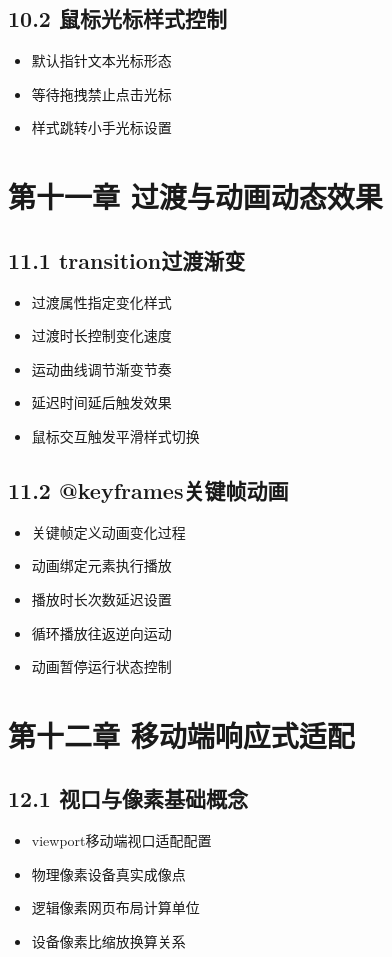 \subsection{10.2 鼠标光标样式控制}
\begin{itemize}[leftmargin=*]
\item 默认指针文本光标形态
\item 等待拖拽禁止点击光标
\item 样式跳转小手光标设置
\end{itemize}

\section{第十一章 过渡与动画动态效果}
\subsection{11.1 transition过渡渐变}
\begin{itemize}[leftmargin=*]
\item 过渡属性指定变化样式
\item 过渡时长控制变化速度
\item 运动曲线调节渐变节奏
\item 延迟时间延后触发效果
\item 鼠标交互触发平滑样式切换
\end{itemize}

\subsection{11.2 @keyframes关键帧动画}
\begin{itemize}[leftmargin=*]
\item 关键帧定义动画变化过程
\item 动画绑定元素执行播放
\item 播放时长次数延迟设置
\item 循环播放往返逆向运动
\item 动画暂停运行状态控制
\end{itemize}

\section{第十二章 移动端响应式适配}
\subsection{12.1 视口与像素基础概念}
\begin{itemize}[leftmargin=*]
\item viewport移动端视口适配配置
\item 物理像素设备真实成像点
\item 逻辑像素网页布局计算单位
\item 设备像素比缩放换算关系
\end{itemize}

